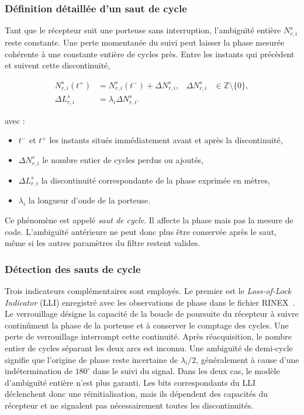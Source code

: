 \iffalse
\subsubsection{Définition détaillée d'un saut de cycle}

Tant que le récepteur suit une porteuse sans interruption, l'ambiguïté entière
$N_{r,i}^s$ reste constante. Une perte momentanée du suivi peut laisser la
phase mesurée cohérente à une constante entière de cycles près. Entre les
instants qui précèdent et suivent cette discontinuité,

\begin{align}
N_{r,i}^s(t^+)
&=
N_{r,i}^s(t^-)+\Delta N_{r,i}^s,
&
\Delta N_{r,i}^s
&\in\mathbb Z\setminus\{0\},
\\
\Delta L_{r,i}^s
&=
\lambda_i\Delta N_{r,i}^s.
\label{ppp:eq:cycle_slip_definition}
\end{align}

avec :

\begin{itemize}
    \item $t^-$ et $t^+$ les instants situés immédiatement avant et après la
    discontinuité,
    \item $\Delta N_{r,i}^s$ le nombre entier de cycles perdus ou ajoutés,
    \item $\Delta L_{r,i}^s$ la discontinuité correspondante de la phase
    exprimée en mètres,
    \item $\lambda_i$ la longueur d'onde de la porteuse.
\end{itemize}

Ce phénomène est appelé \emph{saut de cycle}. Il affecte la phase mais pas la
mesure de code. L'ambiguïté antérieure ne peut donc plus être conservée après
le saut, même si les autres paramètres du filtre restent valides.

\subsubsection{Détection des sauts de cycle}

Trois indicateurs complémentaires sont employés. Le premier est le
\textit{Loss-of-Lock Indicator} (LLI) enregistré avec les observations de
phase dans le fichier RINEX~\cite{rinex304}. Le verrouillage désigne la capacité de la boucle
de poursuite du récepteur à suivre continûment la phase de la porteuse et à
conserver le comptage des cycles. Une perte de verrouillage interrompt cette
continuité. Après réacquisition, le nombre entier de cycles séparant les deux
arcs est inconnu. Une ambiguïté de demi-cycle signifie que l'origine de phase
reste incertaine de $\lambda_i/2$, généralement à cause d'une indétermination
de $180^\circ$ dans le suivi du signal. Dans les deux cas, le modèle
d'ambiguïté entière n'est plus garanti. Les bits correspondants du LLI
déclenchent donc une réinitialisation, mais ils dépendent des capacités du
récepteur et ne signalent pas nécessairement toutes les discontinuités.

